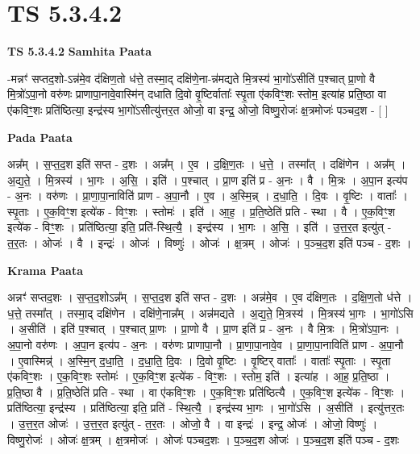\documentclass[17pt]{extarticle}
\begin{document}
\section{ TS 5.3.4.2 }

\textbf{TS 5.3.4.2 } \newline
\textbf{Samhita Paata} \newline

-मन्नꣳ॑ सप्तद॒शो-ऽन्न॑मे॒व द॑क्षिण॒तो ध॑त्ते॒ तस्मा॒द् दक्षि॑णे॒ना-न्न॑मद्यते मि॒त्रस्य॑ भा॒गो॑ऽसीति॑ प॒श्चात् प्रा॒णो वै मि॒त्रो॑ऽपा॒नो वरु॑णः प्राणापा॒नावे॒वास्मि॑न् दधाति दि॒वो वृ॒ष्टिर्वाताः᳚ स्पृ॒ता ए॑कविꣳ॒॒शः स्तोम॒ इत्या॑ह प्रति॒ष्ठा वा ए॑कविꣳ॒॒शः प्रति॑ष्ठित्या॒ इन्द्र॑स्य भा॒गो॑ऽसीत्यु॑त्तर॒त ओजो॒ वा इन्द्र॒ ओजो॒ विष्णु॒रोजः॑ क्ष॒त्रमोजः॑ पञ्चद॒श - [  ] \newline

\textbf{Pada Paata} \newline

अन्न᳚म् । स॒प्त॒द॒श इति॑ सप्त - द॒शः । अन्न᳚म् । ए॒व । द॒क्षि॒ण॒तः । ध॒त्ते॒ । तस्मा᳚त् । दक्षि॑णेन । अन्न᳚म् । अ॒द्य॒ते॒ । मि॒त्रस्य॑ । भा॒गः । अ॒सि॒ । इति॑ । प॒श्चात् । प्रा॒ण इति॑ प्र - अ॒नः । वै । मि॒त्रः । अ॒पा॒न इत्य॑प - अ॒नः । वरु॑णः । प्रा॒णा॒पा॒नाविति॑ प्राण - अ॒पा॒नौ । ए॒व । अ॒स्मि॒न्न् । द॒धा॒ति॒ । दि॒वः । वृ॒ष्टिः । वाताः᳚ । स्पृ॒ताः । ए॒क॒विꣳ॒॒श इत्ये॑क - विꣳ॒॒शः । स्तोमः॑ । इति॑ । आ॒ह॒ । प्र॒ति॒ष्ठेति॑ प्रति - स्था । वै । ए॒क॒विꣳ॒॒श इत्ये॑क - विꣳ॒॒शः । प्रति॑ष्ठित्या॒ इति॒ प्रति॑-स्थि॒त्यै॒ । इन्द्र॑स्य । भा॒गः । अ॒सि॒ । इति॑ । उ॒त्त॒र॒त इत्यु॑त् - त॒र॒तः । ओजः॑ । वै । इन्द्रः॑ । ओजः॑ । विष्णुः॑ । ओजः॑ । क्ष॒त्रम् । ओजः॑ । प॒ञ्च॒द॒श इति॑ पञ्च - द॒शः ।  \newline


\textbf{Krama Paata} \newline

अन्नꣳ॑ सप्तद॒शः । स॒प्त॒द॒शोऽन्न᳚म् । स॒प्त॒द॒श इति॑ सप्त - द॒शः । अन्न॑मे॒व । ए॒व द॑क्षिण॒तः । द॒क्षि॒ण॒तो ध॑त्ते । ध॒त्ते॒ तस्मा᳚त् । तस्मा॒द् दक्षि॑णेन । दक्षि॑णे॒नान्न᳚म् । अन्न॑मद्यते । अ॒द्य॒ते॒ मि॒त्रस्य॑ । मि॒त्रस्य॑ भा॒गः । भा॒गो॑ऽसि । अ॒सीति॑ । इति॑ प॒श्चात् । प॒श्चात् प्रा॒णः । प्रा॒णो वै । प्रा॒ण इति॑ प्र - अ॒नः । वै मि॒त्रः । मि॒त्रो॑ऽपा॒नः । अ॒पा॒नो वरु॑णः । अ॒पा॒न इत्य॑प - अ॒नः । वरु॑णः प्राणापा॒नौ । प्रा॒णा॒पा॒नावे॒व । प्रा॒णा॒पा॒नाविति॑ प्राण - अ॒पा॒नौ । ए॒वास्मिन्न्॑ । अ॒स्मि॒न् द॒धा॒ति॒ । द॒धा॒ति॒ दि॒वः । दि॒वो वृ॒ष्टिः । वृ॒ष्टिर् वाताः᳚ । वाताः᳚ स्पृ॒ताः । स्पृ॒ता ए॑कविꣳ॒॒शः । ए॒क॒विꣳ॒॒शः स्तोमः॑ । ए॒क॒विꣳ॒॒श इत्ये॑क - विꣳ॒॒शः । स्तोम॒ इति॑ । इत्या॑ह । आ॒ह॒ प्र॒ति॒ष्ठा । प्र॒ति॒ष्ठा वै । प्र॒ति॒ष्ठेति॑ प्रति - स्था । वा ए॑कविꣳ॒॒शः । ए॒क॒विꣳ॒॒शः प्रति॑ष्ठित्यै । ए॒क॒विꣳ॒॒श इत्ये॑क - विꣳ॒॒शः । प्रति॑ष्ठित्या॒ इन्द्र॑स्य । प्रति॑ष्ठित्या॒ इति॒ प्रति॑ - स्थि॒त्यै॒ । इन्द्र॑स्य भा॒गः । भा॒गो॑ऽसि । अ॒सीति॑ । इत्यु॑त्तर॒तः । उ॒त्त॒र॒त ओजः॑ । उ॒त्त॒र॒त इत्यु॑त् - त॒र॒तः । ओजो॒ वै । वा इन्द्रः॑ । इन्द्र॒ ओजः॑ । ओजो॒ विष्णुः॑ । विष्णु॒रोजः॑ । ओजः॑ क्ष॒त्रम् । क्ष॒त्रमोजः॑ । ओजः॑ पञ्चद॒शः । प॒ञ्च॒द॒श ओजः॑ । प॒ञ्च॒द॒श इति॑ पञ्च - द॒शः \newline
\end{document}
